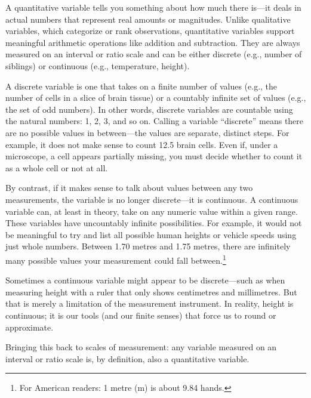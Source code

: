A \gls{quantitative variable} tells you something about how much there is—it deals in actual numbers that represent real amounts or magnitudes. Unlike qualitative variables, which categorize or rank observations, quantitative variables support meaningful arithmetic operations like addition and subtraction. They are always measured on an interval or ratio scale and can be either discrete (e.g., number of siblings) or continuous (e.g., temperature, height).\label{sec:quant_var}

A \gls{discrete variable} is one that takes on a finite number of values (e.g., the number of cells in a slice of brain tissue) or a countably infinite set of values (e.g., the set of odd numbers). In other words, discrete variables are countable using the natural numbers: 1, 2, 3, and so on. Calling a variable ``discrete'' means there are no possible values in between—the values are separate, distinct steps. For example, it does not make sense to count 12.5 brain cells. Even if, under a microscope, a cell appears partially missing, you must decide whether to count it as a whole cell or not at all.

By contrast, if it makes sense to talk about values between any two measurements, the variable is no longer discrete—it is continuous. A \gls{continuous variable} can, at least in theory, take on any numeric value within a given range. These variables have uncountably infinite possibilities. For example, it would not be meaningful to try and list all possible human heights or vehicle speeds using just whole numbers. Between 1.70 metres and 1.75 metres, there are infinitely many possible values your measurement could fall between.\footnote{For American readers: 1 metre (m) is about 9.84 hands.}

Sometimes a continuous variable might appear to be discrete—such as when measuring height with a ruler that only shows centimetres and millimetres. But that is merely a limitation of the measurement instrument. In reality, height is continuous; it is our tools (and our finite senses) that force us to round or approximate.

Bringing this back to scales of measurement: any variable measured on an interval or ratio scale is, by definition, also a quantitative variable.



